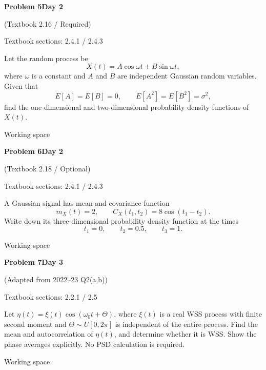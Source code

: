 \documentclass[11pt]{article}
\newcommand{\qtitle}[2]{\clearpage\begin{tcolorbox}[colback=navy,colframe=navy,arc=1.5pt,boxrule=0pt]\color{white}\large\bfseries #1\hfill\small #2\end{tcolorbox}}
\begin{document}
\qtitle{Problem 5}{Day 2}
{\small\color{accentred}(Textbook 2.16 / Required)}\par\smallskip
{\small\color{muted}Textbook sections: 2.4.1 / 2.4.3}\par\medskip
\begin{tcolorbox}[colback=qbg,colframe=qbg,boxrule=0pt]Let the random process be
\[
X(t)=A\cos\omega t+B\sin\omega t,
\]
where $\omega$ is a constant and $A$ and $B$ are independent Gaussian random variables. Given that
\[
E[A]=E[B]=0,\qquad E[A^2]=E[B^2]=\sigma^2,
\]
find the one-dimensional and two-dimensional probability density functions of $X(t)$.
\end{tcolorbox}\smallskip\begin{workspace}\hfill{\color{linec}\footnotesize Working space}\end{workspace}
\qtitle{Problem 6}{Day 2}
{\small\color{accentred}(Textbook 2.18 / Optional)}\par\smallskip
{\small\color{muted}Textbook sections: 2.4.1 / 2.4.3}\par\medskip
\begin{tcolorbox}[colback=qbg,colframe=qbg,boxrule=0pt]A Gaussian signal has mean and covariance function
\[
m_X(t)=2,\qquad C_X(t_1,t_2)=8\cos(t_1-t_2).
\]
Write down its three-dimensional probability density function at the times
\[
t_1=0,\qquad t_2=0.5,\qquad t_3=1.
\]
\end{tcolorbox}\smallskip\begin{workspace}\hfill{\color{linec}\footnotesize Working space}\end{workspace}
\qtitle{Problem 7}{Day 3}
{\small\color{accentred}(Adapted from 2022--23 Q2(a,b))}\par\smallskip
{\small\color{muted}Textbook sections: 2.2.1 / 2.5}\par\medskip
\begin{tcolorbox}[colback=qbg,colframe=qbg,boxrule=0pt]Let $\eta(t)=\xi(t)\cos(\omega_0t+\Theta)$, where $\xi(t)$ is a real WSS process with finite second moment and $\Theta\sim U[0,2\pi]$ is independent of the entire process.
Find the mean and autocorrelation of $\eta(t)$, and determine whether it is WSS. Show the phase averages explicitly. No PSD calculation is required.
\end{tcolorbox}\smallskip\begin{workspace}\hfill{\color{linec}\footnotesize Working space}\end{workspace}
\end{document}
